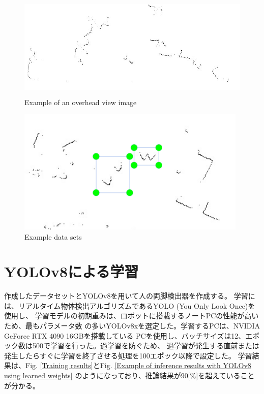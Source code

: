 \begin{figure}[h]
    \begin{center}
    \includegraphics[height=50mm,clip]{figure/laser_img_232.jpg}
    \caption{Example of an overhead view image}
    \label{Example of an overhead view image}
    \end{center}
\end{figure}

\begin{figure}[h]
    \begin{center}
    \includegraphics[height=60mm,clip]{figure/Example-data-sets.png}
    \caption{Example data sets}
    \label{Example data sets}
    \end{center}
\end{figure}

\section{YOLOv8による学習}
作成したデータセットとYOLOv8を用いて人の両脚検出器を作成する。
学習には、リアルタイム物体検出アルゴリズムであるYOLO (You Only Look Once)を使用し、
学習モデルの初期重みは、ロボットに搭載するノートPCの性能が高いため、最もパラメータ数
の多いYOLOv8xを選定した。学習するPCは、NVIDIA GeForce RTX 4090 16GBを搭載している
PCを使用し、バッチサイズは12、エポック数は500で学習を行った。過学習を防ぐため、
過学習が発生する直前または発生したらすぐに学習を終了させる処理を100エポック以降で設定した。
学習結果は、Fig. \ref{Training results}とFig. \ref{Example of inference results with YOLOv8 using learned weights}
のようになっており、推論結果が90[\%]を超えていることが分かる。

